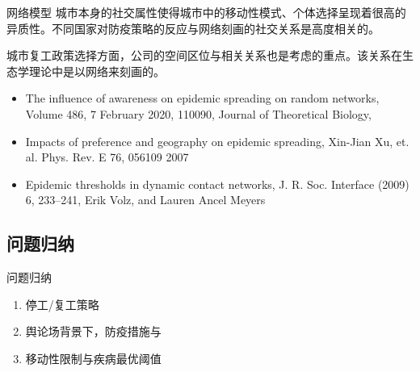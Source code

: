 \begin{frame}{网络模型}
城市本身的社交属性使得城市中的移动性模式、个体选择呈现着很高的异质性。不同国家对防疫策略的反应与网络刻画的社交关系是高度相关的。
\vspace{0.5cm}

城市复工政策选择方面，公司的空间区位与相关关系也是考虑的重点。该关系在生态学理论中是以网络来刻画的。
    \begin{itemize}
        \item The influence of awareness on epidemic spreading on random networks, Volume 486, 7 February 2020, 110090, Journal of Theoretical Biology, 
        \item Impacts of preference and geography on epidemic spreading, Xin-Jian Xu, et. al. Phys. Rev. E 76, 056109 2007
        \item Epidemic thresholds in dynamic contact networks, J. R. Soc. Interface (2009) 6, 233–241, Erik Volz, and Lauren Ancel Meyers
    \end{itemize}
\end{frame}
\subsection{问题归纳}

\begin{frame}{问题归纳}
    \begin{enumerate}
        \item 停工/复工策略
        \item 舆论场背景下，防疫措施与
        \item 移动性限制与疾病最优阈值
    \end{enumerate}
\end{frame}